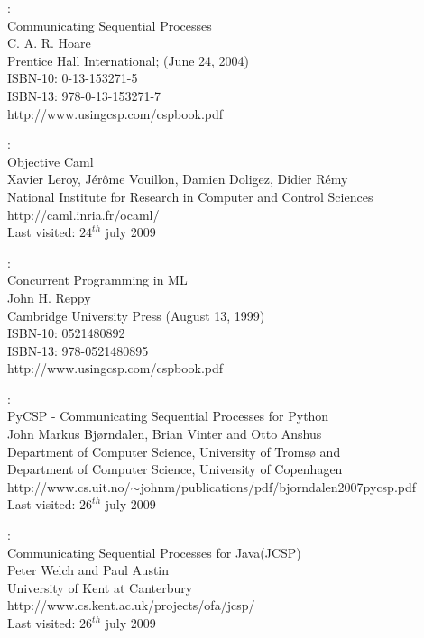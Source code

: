 \documentclass[a4paper,12pt]{article}
\begin{document}
\newpage
\begin{thebibliography}{99}

:\\
Communicating Sequential Processes\\
C. A. R. Hoare\\
Prentice Hall International; (June 24, 2004)\\
ISBN-10: 0-13-153271-5\\
ISBN-13: 978-0-13-153271-7\\
http://www.usingcsp.com/cspbook.pdf

:\\
Objective Caml\\
Xavier Leroy, Jérôme Vouillon, Damien Doligez, Didier Rémy\\
National Institute for Research in Computer and Control Sciences\\
http://caml.inria.fr/ocaml/\\
Last visited: $24^{th}$ july 2009

:\\
Concurrent Programming in ML\\
John H. Reppy\\
Cambridge University Press (August 13, 1999)\\
ISBN-10: 0521480892\\
ISBN-13: 978-0521480895\\
http://www.usingcsp.com/cspbook.pdf

:\\
PyCSP - Communicating Sequential Processes for Python\\
John Markus Bjørndalen, Brian Vinter and Otto Anshus\\
Department of Computer Science, University of Tromsø and\\
Department of Computer Science, University of Copenhagen\\
http://www.cs.uit.no/$\sim$johnm/publications/pdf/bjorndalen2007pycsp.pdf\\
Last visited: $26^{th}$ july 2009

:\\
Communicating Sequential Processes for Java\texttrademark (JCSP)\\
Peter Welch and Paul Austin\\
University of Kent at Canterbury\\
http://www.cs.kent.ac.uk/projects/ofa/jcsp/\\
Last visited: $26^{th}$ july 2009


\end{thebibliography}
\end{document}
